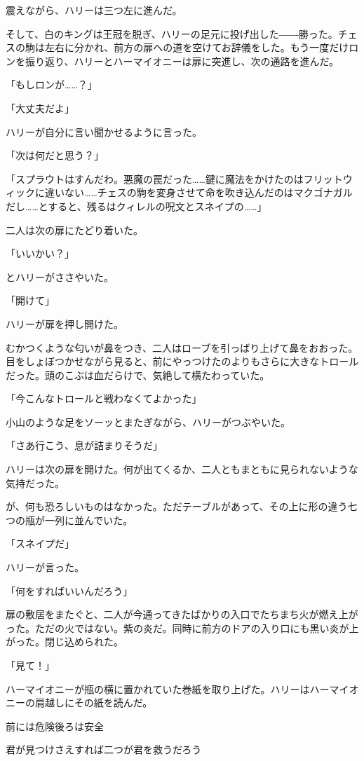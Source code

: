 \documentclass[10pt,a4paper]{article}
\begin{document}
\begin{CJK}{UTF8}{min}
震えながら、ハリーは三つ左に進んだ。

そして、白のキングは王冠を脱ぎ、ハリーの足元に投げ出した――勝った。チェスの駒は左右に分かれ、前方の扉への道を空けてお辞儀をした。もう一度だけロンを振り返り、ハリーとハーマイオニーは扉に突進し、次の通路を進んだ。

「もしロンが……？」

「大丈夫だよ」

ハリーが自分に言い聞かせるように言った。

「次は何だと思う？」

「スプラウトはすんだわ。悪魔の罠だった……鍵に魔法をかけたのはフリットウィックに違いない……チェスの駒を変身させて命を吹き込んだのはマクゴナガルだし……とすると、残るはクィレルの呪文とスネイプの……」

二人は次の扉にたどり着いた。

「いいかい？」

とハリーがささやいた。

「開けて」

ハリーが扉を押し開けた。

むかつくような匂いが鼻をつき、二人はローブを引っばり上げて鼻をおおった。目をしょぼつかせながら見ると、前にやっつけたのよりもさらに大きなトロールだった。頭のこぶは血だらけで、気絶して横たわっていた。

「今こんなトロールと戦わなくてよかった」

小山のような足をソーッとまたぎながら、ハリーがつぶやいた。

「さあ行こう、息が詰まりそうだ」

ハリーは次の扉を開けた。何が出てくるか、二人ともまともに見られないような気持だった。

が、何も恐ろしいものはなかった。ただテーブルがあって、その上に形の違う七つの瓶が一列に並んでいた。

「スネイプだ」

ハリーが言った。

「何をすればいいんだろう」

扉の敷居をまたぐと、二人が今通ってきたばかりの入口でたちまち火が燃え上がった。ただの火ではない。紫の炎だ。同時に前方のドアの入り口にも黒い炎が上がった。閉じ込められた。

「見て！」

ハーマイオニーが瓶の横に置かれていた巻紙を取り上げた。ハリーはハーマイオニーの肩越しにその紙を読んだ。



前には危険後ろは安全

君が見つけさえすれば二つが君を救うだろう


\end{CJK}
\end{document}
